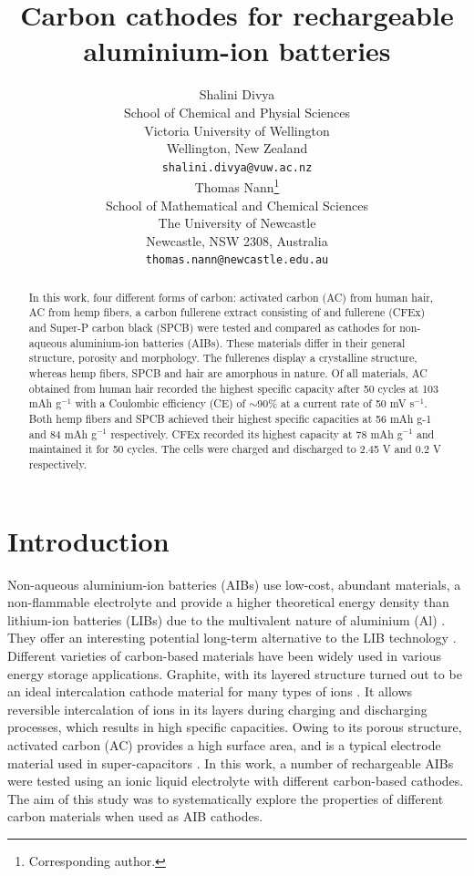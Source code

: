 \documentclass{article}
\title{Carbon cathodes for rechargeable aluminium-ion batteries}
\author{
  Shalini Divya\\
  School of Chemical and Physial Sciences\\
  Victoria University of Wellington\\
  Wellington, New Zealand\\
  \texttt{shalini.divya@vuw.ac.nz}\\
   \And
  Thomas Nann\thanks{Corresponding author.}\\
  School of Mathematical and Chemical Sciences\\
  The University of Newcastle\\
  Newcastle, NSW 2308, Australia\\
  \texttt{thomas.nann@newcastle.edu.au}\\
}
\begin{document}
\maketitle
\begin{abstract}
 In this work, four different forms of carbon: activated carbon (AC) from human hair, AC from hemp fibers, a carbon fullerene extract consisting of  and  fullerene (CFEx) and Super-P carbon black (SPCB) were tested and compared as cathodes for non-aqueous aluminium-ion batteries (AIBs). These materials differ in their general structure, porosity and morphology. The fullerenes display a crystalline structure, whereas hemp fibers, SPCB and hair are amorphous in nature. Of all materials, AC obtained from human hair recorded the highest specific capacity after 50 cycles at 103 mAh g$^{-1}$ with a Coulombic efficiency (CE) of $\sim$90\% at a current rate of 50 mV s$^{-1}$. Both hemp fibers and SPCB achieved their highest specific capacities at 56 mAh g-1 and 84 mAh g$^{-1}$ respectively. CFEx recorded its highest capacity at 78 mAh g$^{-1}$ and maintained it for 50 cycles. The cells were charged and discharged to 2.45 V and 0.2 V respectively. 
 \end{abstract}
 

\section{Introduction}
Non-aqueous aluminium-ion batteries (AIBs) use low-cost, abundant materials, a non-flammable electrolyte and provide a higher theoretical energy density than lithium-ion batteries (LIBs) due to the multivalent nature of aluminium (Al) \cite{lin_ultrafast_2015-2,paranthaman_transformational_2010,wang_advanced_2017}. They offer an interesting potential long-term alternative to the LIB technology \cite{ambroz_trends_2017-1}. Different varieties of carbon-based materials have been widely used in various energy storage applications. Graphite, with its layered structure turned out to be an ideal intercalation cathode material for many types of ions \cite{ji_recent_2011, yoo_large_2008, lian_large_2010}. It allows reversible intercalation of ions in its layers during charging and discharging processes, which results in high specific capacities. Owing to its porous structure, activated carbon (AC) provides a high surface area, and is a typical electrode material used in super-capacitors \cite{eliad_ion_2001, zhu_carbon-based_2011-2}. In this work, a number of rechargeable AIBs were tested using an ionic liquid electrolyte with different carbon-based cathodes. The aim of this study was to systematically explore the properties of different carbon materials when used as AIB cathodes.
\end{document}
